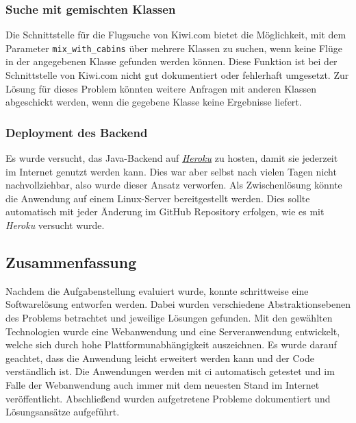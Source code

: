 \documentclass[12pt,twoside,a4paper]{article}
\begin{document}
\begin{sloppypar}
\subsubsection{Suche mit gemischten Klassen}\label{sec:mixed-classes}
Die Schnittstelle für die Flugsuche von Kiwi.com bietet die Möglichkeit, mit dem Parameter \texttt{mix\_with\_cabins} über mehrere Klassen zu suchen, wenn keine Flüge in der angegebenen Klasse gefunden werden können. Diese Funktion ist bei der Schnittstelle von Kiwi.com nicht gut dokumentiert oder fehlerhaft umgesetzt. Zur Lösung für dieses Problem könnten weitere Anfragen mit anderen Klassen abgeschickt werden, wenn die gegebene Klasse keine Ergebnisse liefert.
\subsubsection{Deployment des Backend}
Es wurde versucht, das Java-Backend auf \href{https://www.heroku.com/}{\textit{Heroku}} zu hosten, damit sie jederzeit im Internet genutzt werden kann. Dies war aber selbst nach vielen Tagen nicht nachvollziehbar, also wurde dieser Ansatz verworfen. Als Zwischenlösung könnte die Anwendung auf einem Linux-Server bereitgestellt werden. Dies sollte automatisch mit jeder Änderung im GitHub Repository erfolgen, wie es mit \textit{Heroku} versucht wurde.
\subsection{Zusammenfassung}
Nachdem die Aufgabenstellung evaluiert wurde, konnte schrittweise eine Softwarelösung entworfen werden. Dabei wurden verschiedene Abstraktionsebenen des Problems betrachtet und jeweilige Lösungen gefunden. Mit den gewählten Technologien wurde eine Webanwendung und eine Serveranwendung entwickelt, welche sich durch hohe Plattformunabhängigkeit auszeichnen. Es wurde darauf geachtet, dass die Anwendung leicht erweitert werden kann und der Code verständlich ist. Die Anwendungen werden mit \acrfull{ci} automatisch getestet und im Falle der Webanwendung auch immer mit dem neuesten Stand im Internet veröffentlicht. Abschließend wurden aufgetretene Probleme dokumentiert und Lösungsansätze aufgeführt.
\end{sloppypar}
\newpage


\end{document}
